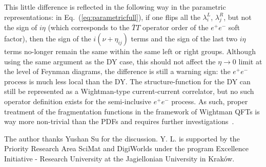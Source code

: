 \documentclass[a4paper,11pt]{article}
\begin{document}
\begin{enumerate}
   This little difference is reflected in the following way in the parametric representations: in Eq.~(\ref{eq:parametricfull}), if one flips all the $\lambda^L_i$, $\lambda^R_j$, but not the sign of $i\eta$ (which corresponds to the $\bar T T$ operator order of the $e^+e^-$ soft factor), then the sign of the $i(\nu+\eta_{ij})$ terms and the sign of the last two $i\eta$ terms no-longer remain the same within the same left or right groups.  Although using the same argument as the DY case, this should not affect the $\eta \rightarrow 0$ limit at the level of Feynman diagrams, the difference is still a warning sign: the $e^+e^-$ process is much less local than the DY. The structure-function for the DY can still be represented as a Wightman-type current-current correlator, but no such operator definition exists for the semi-inclusive $e^+e^-$ process.  As such, proper treatment of the fragmentation functions in the framework of Wightman QFTs is way more non-trivial than the PDFs and requires further investigations~\cite{Collins:2023cuo}.
\end{enumerate}



\acknowledgments
The author thanks Yushan Su for the discussion. Y. L. is supported by the Priority Research Area SciMat and DigiWorlds under the program Excellence Initiative - Research University at the Jagiellonian University in Krak\'{o}w.

\appendix
\end{document}
